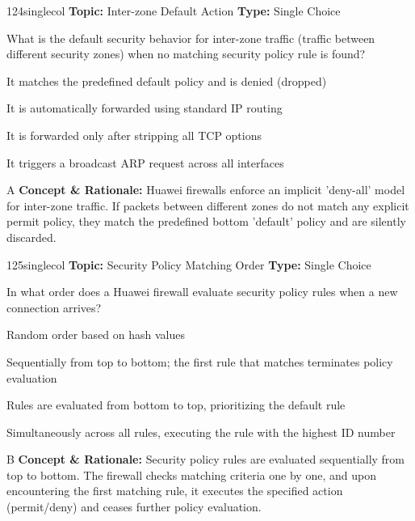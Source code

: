 \begin{qcard}{124}{singlecol}
\textcolor{darkslate!75}{\small\textbf{Topic:} Inter-zone Default Action \hfill \textbf{Type:} Single Choice}\vspace{0.4em}\par
What is the default security behavior for inter-zone traffic (traffic between different security zones) when no matching security policy rule is found?
\begin{qoptions}
\item It matches the predefined default policy and is denied (dropped)
\item It is automatically forwarded using standard IP routing
\item It is forwarded only after stripping all TCP options
\item It triggers a broadcast ARP request across all interfaces
\end{qoptions}
\end{qcard}
\nopagebreak
\begin{explainbox}{A}
\textbf{Concept \& Rationale:} Huawei firewalls enforce an implicit 'deny-all' model for inter-zone traffic. If packets between different zones do not match any explicit permit policy, they match the predefined bottom 'default' policy and are silently discarded.
\end{explainbox}

\begin{qcard}{125}{singlecol}
\textcolor{darkslate!75}{\small\textbf{Topic:} Security Policy Matching Order \hfill \textbf{Type:} Single Choice}\vspace{0.4em}\par
In what order does a Huawei firewall evaluate security policy rules when a new connection arrives?
\begin{qoptions}
\item Random order based on hash values
\item Sequentially from top to bottom; the first rule that matches terminates policy evaluation
\item Rules are evaluated from bottom to top, prioritizing the default rule
\item Simultaneously across all rules, executing the rule with the highest ID number
\end{qoptions}
\end{qcard}
\nopagebreak
\begin{explainbox}{B}
\textbf{Concept \& Rationale:} Security policy rules are evaluated sequentially from top to bottom. The firewall checks matching criteria one by one, and upon encountering the first matching rule, it executes the specified action (permit/deny) and ceases further policy evaluation.
\end{explainbox}

